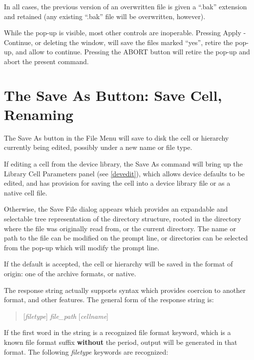 In all cases, the previous version of an overwritten file is given a
``{\vt .bak}'' extension and retained (any existing ``{\vt .bak}''
file will be overwritten, however).

While the pop-up is visible, most other controls are inoperable. 
Pressing {\cb Apply - Continue}, or deleting the window, will save the
files marked ``{\vt yes}'', retire the pop-up, and allow {\Xic} to
continue.  Pressing the {\cb ABORT} button will retire the pop-up and
abort the present command.
 

\section{The {\cb Save As} Button: Save Cell, Renaming}

The {\cb Save As} button in the {\cb File Menu} will save to disk the
cell or hierarchy currently being edited, possibly under a new name or
file type.

If editing a cell from the device library, the {\cb Save As} command
will bring up the {\cb Library Cell Parameters} panel (see
\ref{devedit}), which allows device defaults to be edited, and has
provision for saving the cell into a device library file or as a
native cell file.
 
Otherwise, the {\cb Save File} dialog appears which provides an
expandable and selectable tree representation of the directory
structure, rooted in the directory where the file was originally read
from, or the current directory.  The name or path to the file can be
modified on the prompt line, or directories can be selected from the
pop-up which will modify the prompt line.

If the default is accepted, the cell or hierarchy will be saved in the
format of origin:  one of the archive formats, or native.

The response string actually supports syntax which provides coercion
to another format, and other features.  The general form of the
response string is:

\begin{quote}
[{\it filetype\/}] {\it file\_path} [{\it cellname\/}]
\end{quote}

If the first word in the string is a recognized file format keyword,
which is a known file format suffix {\bf without} the period, output
will be generated in that format.  The following {\it filetype}
keywords are recognized:

